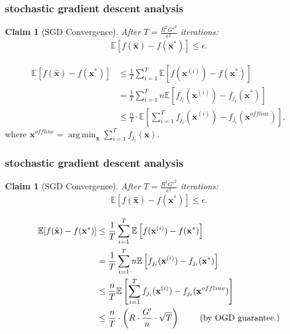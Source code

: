 \documentclass[compress]{beamer}
\newcommand{\bv}[1]{\mathbf{#1}}
\newcommand{\E}{\mathbb{E}}
\DeclareMathOperator*{\argmin}{arg\,min}
\newtheorem{claim}[theorem]{Claim}
\begin{document}
\begin{frame}[t]
	\frametitle{stochastic gradient descent analysis}
	\small
	\begin{claim}[SGD Convergence]
		After $T = \frac{R^2G'^2}{\epsilon^2}$ iterations:
		\vspace{-1em}
		\begin{align*}
			\E\left[f(\hat{\bv{x}}) - f(\bv{x}^*)\right] \leq \epsilon.
		\end{align*}
		
		\vspace{-1em}
	\end{claim}\vspace{-2em}
	\begin{align*}
		\E[f(\hat{\bv{x}}) - f(\bv{x}^*)] &\leq \frac{1}{T}\sum_{i=1}^T\E\left[f(\bv{x}^{(i)}) -f(\bv{x}^*)\right]
		\\
		&=\frac{1}{T}\sum_{i=1}^Tn\E\left[f_{j_i}(\bv{x}^{(i)}) -f_{j_i}(\bv{x}^*)\right]\\
		&\leq \frac{n}{T}\cdot \E\left[\sum_{i=1}^T f_{j_i}(\bv{x}^{(i)}) -f_{j_i}(\bv{x}^{offline})\right], 
	\end{align*}
where $\bv{x}^{offline} = \argmin_{\bv{x}}\sum_{i=1}^{T} f_{j_i}(\bv{x})$.
\end{frame}

\begin{frame}[t]
	\frametitle{stochastic gradient descent analysis}
	\small
	\begin{claim}[SGD Convergence]
		After $T = \frac{R^2G'^2}{\epsilon^2}$ iterations:
		\vspace{-1em}
		\begin{align*}
			\E\left[f(\hat{\bv{x}}) - f(\bv{x}^*)\right] \leq \epsilon.
		\end{align*}
		
		\vspace{-1em}
	\end{claim}\vspace{-2em}
	\begin{align*}
		\E[f(\hat{\bv{x}}) - f(\bv{x}^*)] &\leq \frac{1}{T}\sum_{i=1}^T\E\left[f(\bv{x}^{(i)}) -f(\bv{x}^*)\right]
		\\
		&=\frac{1}{T}\sum_{i=1}^Tn\E\left[f_{j_i}(\bv{x}^{(i)}) -f_{j_i}(\bv{x}^*)\right]\\
		&\leq\frac{n}{T}\E\left[\sum_{i=1}^T f_{j_i}(\bv{x}^{(i)}) -f_{j_i}(\bv{x}^{offline})\right]\\
		& \leq \frac{n}{T} \cdot\left(R\cdot\frac{G'}{n}\cdot \sqrt{T}\right) \text{\hspace{2em} (by OGD guarantee.)}
	\end{align*}
\end{frame}
\end{document}
